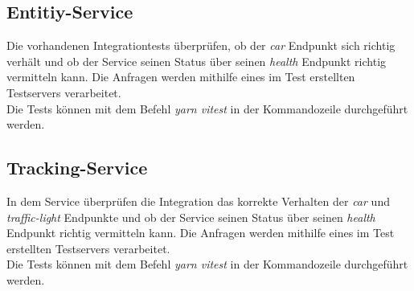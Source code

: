 \subsection{Entitiy-Service}
Die vorhandenen Integrationtests überprüfen, ob der \textit{car} Endpunkt sich richtig verhält und ob der Service seinen Status über seinen \textit{health} Endpunkt richtig vermitteln kann. Die Anfragen werden mithilfe eines im Test erstellten Testservers verarbeitet.\\
Die Tests können mit dem Befehl \textit{yarn vitest} in der Kommandozeile durchgeführt werden. 
\subsection{Tracking-Service}
In dem Service überprüfen die Integration das korrekte Verhalten der \textit{car} und \textit{traffic-light} Endpunkte und ob der Service seinen Status über seinen \textit{health} Endpunkt richtig vermitteln kann.  Die Anfragen werden mithilfe eines im Test erstellten Testservers verarbeitet.\\
Die Tests können mit dem Befehl \textit{yarn vitest} in der Kommandozeile durchgeführt werden.
